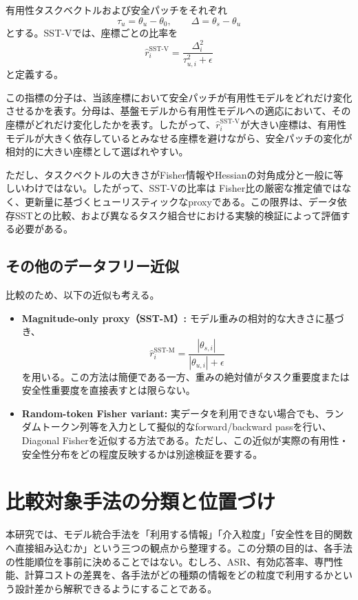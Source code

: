 有用性タスクベクトルおよび安全パッチをそれぞれ
\[
\tau_u=\theta_u-\theta_0,
\qquad
\Delta=\theta_s-\theta_u
\]
とする。SST-Vでは、座標ごとの比率を
\[
\hat{r}^{\mathrm{SST\text{-}V}}_i
=
\frac{\Delta_i^2}
{\tau_{u,i}^2+\epsilon}
\]
と定義する。

この指標の分子は、当該座標において安全パッチが有用性モデルをどれだけ変化させるかを表す。分母は、基盤モデルから有用性モデルへの適応において、その座標がどれだけ変化したかを表す。したがって、\(\hat{r}^{\mathrm{SST\text{-}V}}_i\)が大きい座標は、有用性モデルが大きく依存しているとみなせる座標を避けながら、安全パッチの変化が相対的に大きい座標として選ばれやすい。

ただし、タスクベクトルの大きさがFisher情報やHessianの対角成分と一般に等しいわけではない。したがって、SST-Vの比率は
Fisher比の厳密な推定値ではなく、更新量に基づくヒューリスティックなproxyである。この限界は、データ依存SSTとの比較、および異なるタスク組合せにおける実験的検証によって評価する必要がある。

\subsection{その他のデータフリー近似}

比較のため、以下の近似も考える。

\begin{itemize}
\item \textbf{Magnitude-only proxy（SST-M）:}
  モデル重みの相対的な大きさに基づき、
  \[
  \hat{r}^{\mathrm{SST\text{-}M}}_i
  =
  \frac{|\theta_{s,i}|}
  {|\theta_{u,i}|+\epsilon}
  \]
  を用いる。この方法は簡便である一方、重みの絶対値がタスク重要度または安全性重要度を直接表すとは限らない。

\item \textbf{Random-token Fisher variant:}
  実データを利用できない場合でも、ランダムトークン列等を入力として擬似的なforward/backward passを行い、Diagonal Fisherを近似する方法である。ただし、この近似が実際の有用性・安全性分布をどの程度反映するかは別途検証を要する。
\end{itemize}

\section{比較対象手法の分類と位置づけ}
\label{app:method-taxonomy}

本研究では、モデル統合手法を「利用する情報」「介入粒度」「安全性を目的関数へ直接組み込むか」という三つの観点から整理する。この分類の目的は、各手法の性能順位を事前に決めることではない。むしろ、ASR、有効応答率、専門性能、計算コストの差異を、各手法がどの種類の情報をどの粒度で利用するかという設計差から解釈できるようにすることである。

